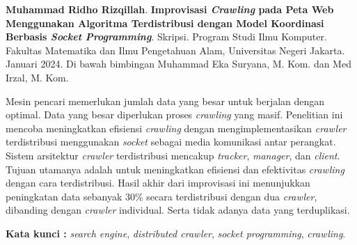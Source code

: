\documentclass{jtetiskripsi}
\begin{document}
\cover{}

% 
% 
% 




\begin{abstractind}

	\textbf{Muhammad Ridho Rizqillah}. 	\textbf{Improvisasi \emph{Crawling} pada Peta Web Menggunakan
  Algoritma Terdistribusi dengan Model Koordinasi Berbasis
  \emph{Socket Programming}}. Skripsi. Program Studi Ilmu Komputer. Fakultas Matematika dan Ilmu Pengetahuan Alam, Universitas Negeri Jakarta. Januari 2024. Di bawah bimbingan Muhammad Eka Suryana, M. Kom. dan Med Irzal, M. Kom.
	\vskip5mm
	
	Mesin pencari memerlukan jumlah data yang besar untuk berjalan dengan optimal. Data yang besar diperlukan proses \emph{crawling} yang masif. Penelitian ini mencoba meningkatkan efisiensi \emph{crawling} dengan mengimplementasikan \emph{crawler} terdistribusi menggunakan \emph{socket} sebagai media komunikasi antar perangkat. Sistem arsitektur \emph{crawler} terdistribusi mencakup \emph{tracker}, \emph{manager}, dan \emph{client}. Tujuan utamanya adalah untuk meningkatkan efisiensi dan efektivitas \emph{crawling} dengan cara terdistribusi. Hasil akhir dari improvisasi ini menunjukkan peningkatan data sebanyak 30\% secara terdistribusi dengan dua \emph{crawler}, dibanding dengan \emph{crawler} individual. Serta tidak adanya data yang terduplikasi.
	
	\bigskip
	\noindent
	\textbf{Kata kunci :} \emph{search engine}, \emph{distributed crawler}, \emph{socket programming}, \emph{crawling}.
\end{abstractind}
\end{document}
